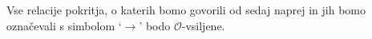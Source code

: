 \documentclass[../TG_magistrsko_delo_sections.tex]{subfiles}
\begin{document}

Vse relacije pokritja, o katerih bomo govorili od sedaj naprej in jih bomo označevali s simbolom `$\to$' bodo $\mathcal{O}$-vsiljene.
\end{document}
